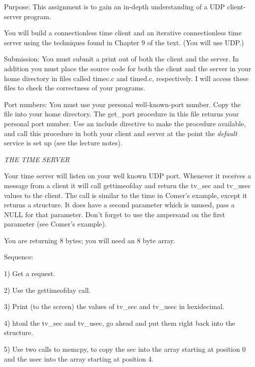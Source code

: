 

\parindent 0pt

Purpose: This assignment is to gain an in-depth understanding of
a UDP client-server program.

You will build a connectionless time client and an iterative connectionless
time server using the techniques found in Chapter 9 of the text.
(You will use UDP.)

Submission: You must submit a print out of both the client and the server.
In addition you must place the source code for both the client and
the server in your home directory in files called {\ltt{}timec.c}
and {\ltt{}timed.c}, respectively. I will access these files to check
the correctness of your programs.

Port numbers: You must use your personal well-known-port number.
Copy the file\hfill{}
into your home directory. The {\ltt{}get_port} procedure in this file 
returns your personal port number.
Use an include directive to make the procedure available,
and call this procedure in both your client and server at the point
the {\it default} service is set up (see the lecture notes).

\noindent
{\it THE TIME SERVER}

Your time server will listen on your well known UDP port.
Whenever it receives a message from a client it will call {\ltt{}gettimeofday}
and return the {\ltt{}tv_sec} and {\ltt{}tv_usec} values to the client.
The call is similar to the {\ltt{}time} in Comer's example,
except it returns a structure.
It does have a second parameter which is unused, pass a {\ltt{}NULL}
for that parameter.
Don't forget to use the ampersand on the first parameter
(see Comer's example).

You are returning 8 bytes; you will need an 8 byte array.

Sequence:

1) Get a request.

2) Use the {\ltt{}gettimeofday} call.

3) Print (to the screen) the values of
{\ltt{}tv_sec} and {\ltt{}tv_usec} in hexidecimal.

4) {\ltt{}htonl} the {\ltt{}tv_sec} and {\ltt{}tv_usec},
go ahead and put them right back into the structure.

5) Use two calls to {\ltt{}memcpy}, to copy the sec into
the array starting at position 0 and
the usec into the array starting at position 4.

